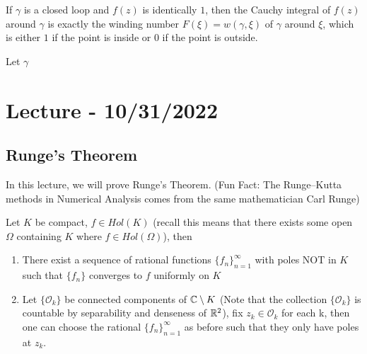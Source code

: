 \documentclass{article}
\begin{document}
\begin{example}
If $\gamma$ is a closed loop and $f(z)$ is identically $1$, then the Cauchy integral of $f(z)$ around $\gamma$ is exactly the winding number $F(\xi) = w(\gamma, \xi)$ of $\gamma$ around $\xi$, which is either $1$ if the point is inside or $0$ if the point is outside.
\end{example}

\begin{theorem}
Let $\gamma$ 
\end{theorem}

\section{Lecture - 10/31/2022}

\subsection{Runge's Theorem}

In this lecture, we will prove Runge's Theorem. (Fun Fact: The Runge–Kutta methods in Numerical Analysis comes from the same mathematician Carl Runge)

\begin{theorem}
    Let $K$ be compact, $f \in Hol(K)$ (recall this means that there exists some open $\Omega$ containing $K$ where $f \in Hol(\Omega)$), then
    \begin{enumerate}
        \item There exist a sequence of rational functions $\{f_n\}_{n = 1}^\infty$ with poles NOT in $K$ such that $\{f_n\}$ converges to $f$ uniformly on $K$
        \item Let $\{\mathcal{O}_k\}$ be connected components of $\mathbb{C} \setminus K$ (Note that the collection $\{\mathcal{O}_k\}$ is countable by separability and denseness of $\mathbb{R}^2$), fix $z_k \in \mathcal{O}_k$ for each k, then one can choose the rational $\{f_n\}_{n = 1}^\infty$ as before such that they only have poles at $z_k$.
    \end{enumerate}
\end{theorem}
\end{document}
